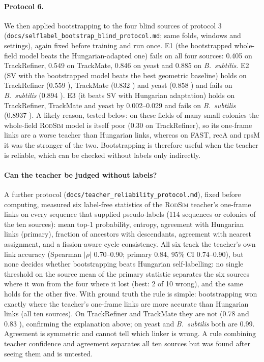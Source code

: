 \documentclass[10pt,twocolumn,letterpaper]{article}
\newcommand{\rodsim}{\textsc{RodSim}\xspace}
\begin{document}
\paragraph{Protocol 6.}
We then applied bootstrapping to the four blind sources of protocol 3 (\texttt{docs/selflabel\_bootstrap\_blind\_protocol.md}; same folds, windows and settings), again fixed before training and run once.
E1 (the bootstrapped whole-field model beats the Hungarian-adapted one) fails on all four sources: 0.405  on TrackRefiner, 0.549  on TrackMate, 0.846  on yeast and 0.885  on \emph{B.~subtilis}.
E2 (SV with the bootstrapped model beats the best geometric baseline) holds on TrackRefiner (0.559 ), TrackMate (0.832 ) and yeast (0.858 ) and fails on \emph{B.~subtilis} (0.894 ).
E3 (it beats SV with Hungarian adaptation) holds on TrackRefiner, TrackMate and yeast by 0.002--0.029 and fails on \emph{B.~subtilis} (0.8937 ).
A likely reason, tested below: on these fields of many small colonies the whole-field \rodsim model is itself poor (0.30 on TrackRefiner), so its one-frame links are a worse teacher than Hungarian links, whereas on FAST, recA and rpsM it was the stronger of the two.
Bootstrapping is therefore useful when the teacher is reliable, which can be checked without labels only indirectly.

\paragraph{Can the teacher be judged without labels?}
A further protocol (\texttt{docs/teacher\_reliability\_protocol.md}), fixed before computing, measured six label-free statistics of the \rodsim teacher's one-frame links on every sequence that supplied pseudo-labels (114 sequences or colonies of the ten sources): mean top-1 probability, entropy, agreement with Hungarian links (primary), fraction of ancestors with descendants, agreement with nearest assignment, and a fission-aware cycle consistency. All six track the teacher's own link accuracy (Spearman $|\rho|$ 0.70--0.90; primary 0.84, 95\% CI 0.74--0.90), but none decides whether bootstrapping beats Hungarian self-labelling: no single threshold on the source mean of the primary statistic separates the six sources where it won from the four where it lost (best: 2 of 10 wrong), and the same holds for the other five. With ground truth the rule is simple: bootstrapping won exactly where the teacher's one-frame links are more accurate than Hungarian links (all ten sources). On TrackRefiner and TrackMate they are not (0.78  and 0.83 ), confirming the explanation above; on yeast and \emph{B.~subtilis} both are 0.99. Agreement is symmetric and cannot tell which linker is wrong. A rule combining teacher confidence and agreement separates all ten sources but was found after seeing them and is untested.
\end{document}
